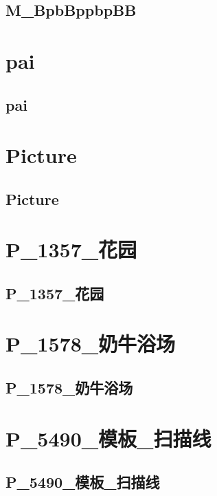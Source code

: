 \subsection{M\_BpbBppbpBB}
\raggedbottom
\hrulefill

\section{pai}
\subsection{pai}
\raggedbottom
\hrulefill

\section{Picture}
\subsection{Picture}
\raggedbottom
\hrulefill

\section{P\_1357\_花园}
\subsection{P\_1357\_花园}
\raggedbottom
\hrulefill

\section{P\_1578\_奶牛浴场}
\subsection{P\_1578\_奶牛浴场}
\raggedbottom
\hrulefill

\section{P\_5490\_模板\_扫描线}
\subsection{P\_5490\_模板\_扫描线}
\raggedbottom
\hrulefill

